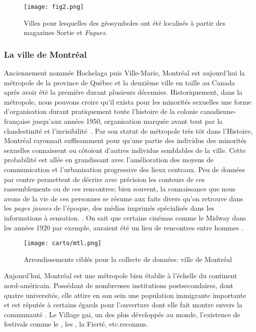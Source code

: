 \begin{figure}[ht]
 \begin{center}
 \texttt{[image: fig2.png]}
 \end{center}
 \caption{Villes pour lesquelles des géosymboles ont été localisés à partir des
 magazines Sortie et \emph{Fugues}.}\label{fig:carte_quebec}
\end{figure}

\subsubsection{La ville de Montréal}
\label{ssub:montreal}
Anciennement nommée Hochelaga puis Ville-Marie, Montréal est aujourd'hui la métropole de la province de Québec et la deuxième ville en taille au Canada après avoir été la première durant plusieurs décennies.
Historiquement, dans la métropole, nous pouvons croire qu'il exista pour les minorités sexuelles une forme d'organisation durant pratiquement toute l'histoire de la colonie canadienne-française jusqu’aux années 1950, organisation marquée avant tout par la clandestinité et l'invisibilité~\citep{Higgins1999}.
Par son statut de métropole très tôt dans l'Histoire, Montréal rayonnait suffisamment pour qu'une partie des individus des minorités sexuelles connaissent ou côtoient d'autres individus semblables de la ville.
Cette probabilité est allée en grandissant avec l'amélioration des moyens de communication et l'urbanisation progressive des lieux centraux.
Peu de données par contre permettent de décrire avec précision les contours de ces rassemblements ou de ces rencontres; bien souvent, la connaissance que nous avons de la vie de ces personnes se résume aux faits divers qu'on retrouve dans les \emph{pages jaunes} de l'époque, des médias imprimés spécialisés dans les informations à sensation.
\citep[]{Higgins1999}.
On sait que certains cinémas comme le Midway dans les années 1920 par exemple, auraient été un lieu de rencontres entre hommes\citep[30]{Higgins1999} .
\begin{figure}[ht]
 \centering
 \texttt{[image: carto/mtl.png]}
 \caption{Arrondissements ciblés pour la collecte de données: ville de
 Montréal}\label{fig:espaces_montreal}
\end{figure}
Aujourd'hui, Montréal est une métropole bien établie à l'échelle du continent nord-américain.
Possédant de nombreuses institutions postsecondaires, dont quatre universités, elle attire en son sein une population immigrante importante et est réputée à certains égards pour l'ouverture dont elle fait montre envers la communauté \lgbt{}.
Le Village gai, un des plus développés au monde, l'existence de festivals comme le , les , la Fierté, etc.\@sont reconnus.

